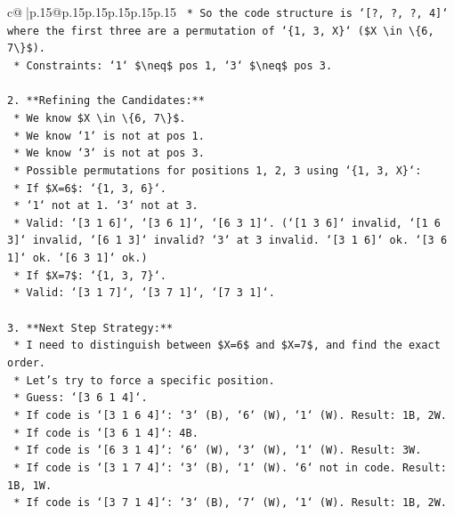 \documentclass{article}
\begin{document}
{\begin{supertabular}{c@{$\;$}|p{.15\linewidth}@{}p{.15\linewidth}p{.15\linewidth}p{.15\linewidth}p{.15\linewidth}p{.15\linewidth}}
{{{\texttt{        *   So the code structure is `{[}?, ?, ?, 4{]}` where the first three are a permutation of `\{1, 3, X\}` (\$X \textbackslash{}in \textbackslash{}\{6, 7\textbackslash{}\}\$).} \\
\texttt{        *   Constraints: `1` \$\textbackslash{}neq\$ pos 1, `3` \$\textbackslash{}neq\$ pos 3.} \\
\\ 
\texttt{2.  **Refining the Candidates:**} \\
\texttt{    *   We know \$X \textbackslash{}in \textbackslash{}\{6, 7\textbackslash{}\}\$.} \\
\texttt{    *   We know `1` is not at pos 1.} \\
\texttt{    *   We know `3` is not at pos 3.} \\
\texttt{    *   Possible permutations for positions 1, 2, 3 using `\{1, 3, X\}`:} \\
\texttt{        *   If \$X=6\$: `\{1, 3, 6\}`.} \\
\texttt{            *   `1` not at 1. `3` not at 3.} \\
\texttt{            *   Valid: `{[}3 1 6{]}`, `{[}3 6 1{]}`, `{[}6 3 1{]}`. (`{[}1 3 6{]}` invalid, `{[}1 6 3{]}` invalid, `{[}6 1 3{]}` invalid? `3` at 3 invalid. `{[}3 1 6{]}` ok. `{[}3 6 1{]}` ok. `{[}6 3 1{]}` ok.)} \\
\texttt{        *   If \$X=7\$: `\{1, 3, 7\}`.} \\
\texttt{            *   Valid: `{[}3 1 7{]}`, `{[}3 7 1{]}`, `{[}7 3 1{]}`.} \\
\\ 
\texttt{3.  **Next Step Strategy:**} \\
\texttt{    *   I need to distinguish between \$X=6\$ and \$X=7\$, and find the exact order.} \\
\texttt{    *   Let's try to force a specific position.} \\
\texttt{    *   Guess: `{[}3 6 1 4{]}`.} \\
\texttt{        *   If code is `{[}3 1 6 4{]}`: `3` (B), `6` (W), `1` (W). Result: 1B, 2W.} \\
\texttt{        *   If code is `{[}3 6 1 4{]}`: 4B.} \\
\texttt{        *   If code is `{[}6 3 1 4{]}`: `6` (W), `3` (W), `1` (W). Result: 3W.} \\
\texttt{        *   If code is `{[}3 1 7 4{]}`: `3` (B), `1` (W). `6` not in code. Result: 1B, 1W.} \\
\texttt{        *   If code is `{[}3 7 1 4{]}`: `3` (B), `7` (W), `1` (W). Result: 1B, 2W.} \\
}}}
\end{supertabular}}
\end{document}
